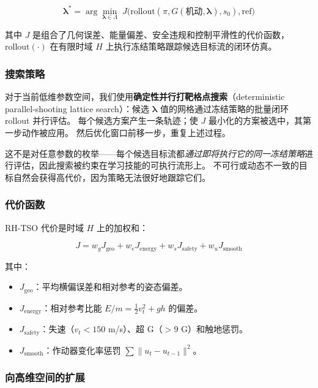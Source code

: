 \documentclass{article}
\begin{document}
\begin{equation}
  \bm{\lambda}^* = \arg\min_{\bm{\lambda} \in \Lambda} \; J\big(\text{rollout}(\pi, G(\text{机动}, \bm{\lambda}), s_0), \text{ref}\big)
\end{equation}

其中 $J$ 是组合了几何误差、能量偏差、安全违规和控制平滑性的代价函数，$\text{rollout}(\cdot)$ 在有限时域 $H$ 上执行冻结策略跟踪候选目标流的闭环仿真。

\subsubsection{搜索策略}

对于当前低维参数空间，我们使用\textbf{确定性并行打靶格点搜索}（deterministic parallel-shooting lattice search）：候选 $\bm{\lambda}$ 值的网格通过冻结策略的批量闭环 rollout 并行评估。
每个候选方案产生一条轨迹；使 $J$ 最小化的方案被选中，其第一步动作被应用。
然后优化窗口前移一步，重复上述过程。

这不是对任意参数的枚举——每个候选目标流都\emph{通过即将执行它的同一冻结策略}进行评估，因此搜索被约束在学习技能的可执行流形上。
不可行或动态不一致的目标自然会获得高代价，因为策略无法很好地跟踪它们。

\subsubsection{代价函数}

RH-TSO 代价是时域 $H$ 上的加权和：

\begin{equation}
  J = w_g J_{\text{geo}} + w_e J_{\text{energy}} + w_s J_{\text{safety}} + w_u J_{\text{smooth}}
\end{equation}

其中：
\begin{itemize}
  \item $J_{\text{geo}}$：平均横偏误差和相对参考的姿态偏差。
  \item $J_{\text{energy}}$：相对参考比能 $E/m = \frac{1}{2}v_t^2 + gh$ 的偏差。
  \item $J_{\text{safety}}$：失速（$v_t < 150$ m/s）、超 G（$>9$ G）和触地惩罚。
  \item $J_{\text{smooth}}$：作动器变化率惩罚 $\sum \|u_t - u_{t-1}\|^2$。
\end{itemize}

\subsubsection{向高维空间的扩展}
\end{document}
